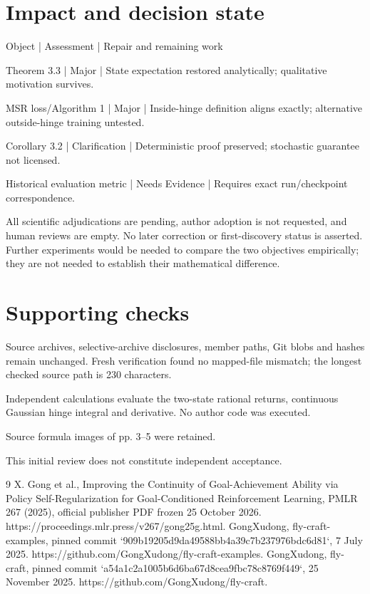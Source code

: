 \documentclass[10pt]{article}
\begin{document}
\section*{Impact and decision state}
Object | Assessment | Repair and remaining work\par
Theorem 3.3 | Major | State expectation restored analytically; qualitative motivation survives.\par
MSR loss/Algorithm 1 | Major | Inside-hinge definition aligns exactly; alternative outside-hinge training untested.\par
Corollary 3.2 | Clarification | Deterministic proof preserved; stochastic guarantee not licensed.\par
Historical evaluation metric | Needs Evidence | Requires exact run/checkpoint correspondence.\par
All scientific adjudications are pending, author adoption is not requested, and human reviews are empty. No later correction or first-discovery status is asserted. Further experiments would be needed to compare the two objectives empirically; they are not needed to establish their mathematical difference.\par
\section*{Supporting checks}
Source archives, selective-archive disclosures, member paths, Git blobs and hashes remain unchanged. Fresh verification found no mapped-file mismatch; the longest checked source path is 230 characters.\par
Independent calculations evaluate the two-state rational returns, continuous Gaussian hinge integral and derivative. No author code was executed.\par
Source formula images of pp. 3–5 were retained.\par
This initial review does not constitute independent acceptance.\par
9 X. Gong et al., Improving the Continuity of Goal-Achievement Ability via Policy Self-Regularization for Goal-Conditioned Reinforcement Learning, PMLR 267 (2025), official publisher PDF frozen 25 October 2026. https://proceedings.mlr.press/v267/gong25g.html. GongXudong, fly-craft-examples, pinned commit `909b19205d9da49588bb4a39c7b237976bdc6d81`, 7 July 2025. https://github.com/GongXudong/fly-craft-examples. GongXudong, fly-craft, pinned commit `a54a1c2a1005b6d6ba67d8cea9fbc78c8769f449`, 25 November 2025. https://github.com/GongXudong/fly-craft.\par
\end{document}
